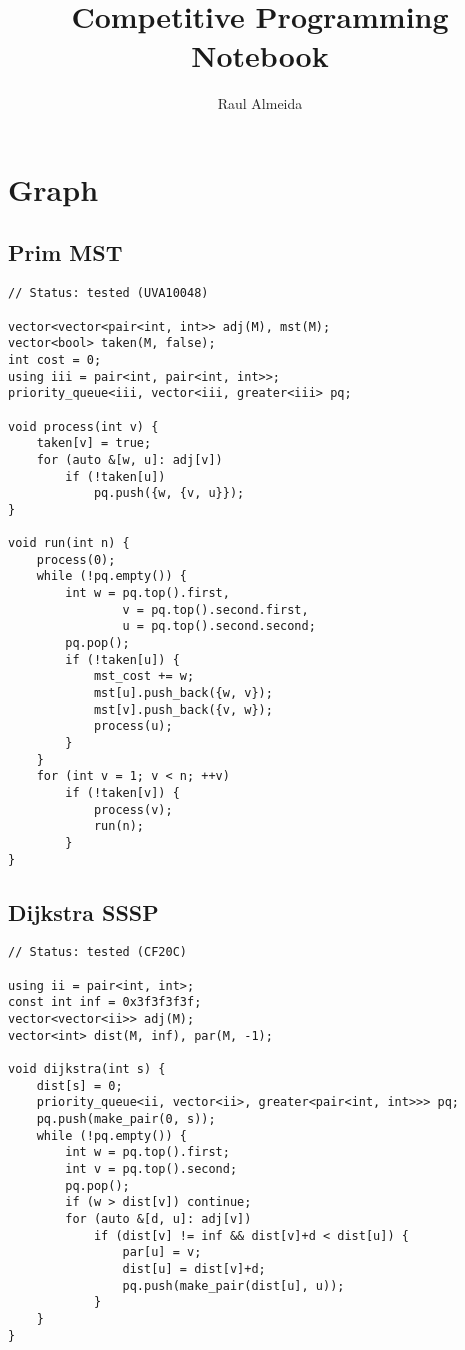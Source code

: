 \documentclass[12pt, a4paper, twoside]{article}
\title{Competitive Programming Notebook}
\author{Raul Almeida}
\begin{document}
\twocolumn
\date{}
\maketitle

\tableofcontents


\section{Graph}

\subsection{Prim MST}
\begin{lstlisting}
// Status: tested (UVA10048)

vector<vector<pair<int, int>> adj(M), mst(M);
vector<bool> taken(M, false);
int cost = 0;
using iii = pair<int, pair<int, int>>;
priority_queue<iii, vector<iii, greater<iii> pq;

void process(int v) {
	taken[v] = true;
	for (auto &[w, u]: adj[v])
		if (!taken[u])
			pq.push({w, {v, u}});
}

void run(int n) {
	process(0);
	while (!pq.empty()) {
		int w = pq.top().first,
				v = pq.top().second.first,
				u = pq.top().second.second;
		pq.pop();
		if (!taken[u]) {
			mst_cost += w;
			mst[u].push_back({w, v});
			mst[v].push_back({v, w});
			process(u);
		}
	}
	for (int v = 1; v < n; ++v)
		if (!taken[v]) {
			process(v);
			run(n);
		}
}
\end{lstlisting}

\subsection{Dijkstra SSSP}
\begin{lstlisting}
// Status: tested (CF20C)

using ii = pair<int, int>;
const int inf = 0x3f3f3f3f;
vector<vector<ii>> adj(M);
vector<int> dist(M, inf), par(M, -1);

void dijkstra(int s) {
	dist[s] = 0;
	priority_queue<ii, vector<ii>, greater<pair<int, int>>> pq;
	pq.push(make_pair(0, s));
	while (!pq.empty()) {
		int w = pq.top().first;
		int v = pq.top().second;
		pq.pop();
		if (w > dist[v]) continue;
		for (auto &[d, u]: adj[v])
			if (dist[v] != inf && dist[v]+d < dist[u]) {
				par[u] = v;
				dist[u] = dist[v]+d;
				pq.push(make_pair(dist[u], u));
			}
	}
}
\end{lstlisting}
\end{document}
